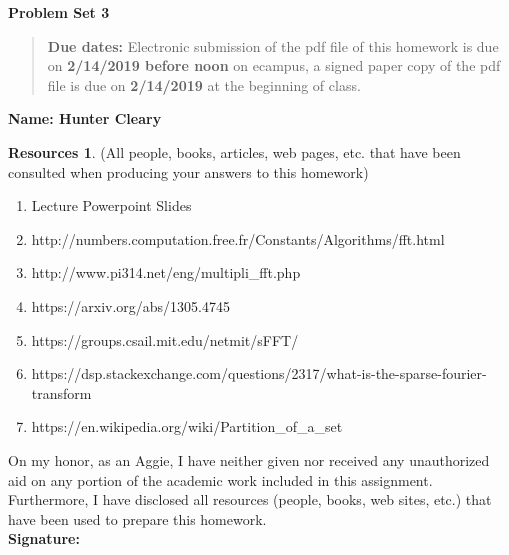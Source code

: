 \documentclass{article}
\theoremstyle{definition}
\newtheorem*{resources}{Resources}
\newcommand{\name}[1]{\noindent\textbf{Name: #1}}
\newcommand{\honor}{\noindent On my honor, as an Aggie, I have neither
  given nor received any unauthorized aid on any portion of the
  academic work included in this assignment. Furthermore, I have
  disclosed all resources (people, books, web sites, etc.) that have
  been used to prepare this homework. \\[1ex]
 \textbf{Signature:} \underline{\hspace*{5cm}} }
\newcommand{\problemset}[1]{\begin{center}\textbf{Problem Set
      #1}\end{center}}
\newcommand{\duedate}[2]{\begin{quote}\textbf{Due dates:} Electronic
    submission of the pdf file of this homework is due on
    \textbf{#1} on ecampus, a signed paper copy of the pdf file is due
    on \textbf{#2} at the beginning of class. \end{quote} }
\begin{document}
\problemset{3}
\duedate{2/14/2019 before noon}{2/14/2019}
\name{ Hunter Cleary }
\begin{resources} (All people, books, articles, web pages, etc. that
  have been consulted when producing your answers to this homework)
  \begin{enumerate}
    \item Lecture Powerpoint Slides
      \item http://numbers.computation.free.fr/Constants/Algorithms/fft.html
      \item http://www.pi314.net/eng/multipli\_fft.php
      \item https://arxiv.org/abs/1305.4745
      \item https://groups.csail.mit.edu/netmit/sFFT/
      \item https://dsp.stackexchange.com/questions/2317/what-is-the-sparse-fourier-transform
      \item https://en.wikipedia.org/wiki/Partition\_of\_a\_set
  \end{enumerate}
\end{resources}
\honor

\newpage
\end{document}
